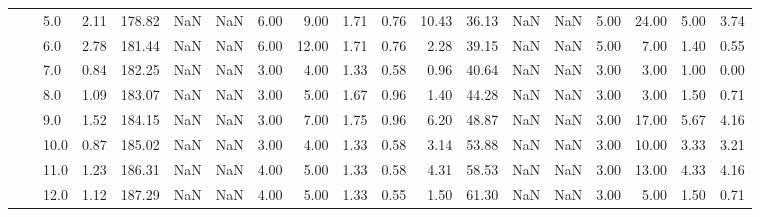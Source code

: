 \begin{tabular}{lllrrrrrrrrrrrrrrrr}
       &     & 5.0  &      2.11 &     178.82 &               NaN &                NaN &  6.00 &   9.00 &             1.71 &                         0.76 &     10.43 &      36.13 &               NaN &                NaN &  5.00 &  24.00 &             5.00 &                         3.74 \\
       &     & 6.0  &      2.78 &     181.44 &               NaN &                NaN &  6.00 &  12.00 &             1.71 &                         0.76 &      2.28 &      39.15 &               NaN &                NaN &  5.00 &   7.00 &             1.40 &                         0.55 \\
       &     & 7.0  &      0.84 &     182.25 &               NaN &                NaN &  3.00 &   4.00 &             1.33 &                         0.58 &      0.96 &      40.64 &               NaN &                NaN &  3.00 &   3.00 &             1.00 &                         0.00 \\
       &     & 8.0  &      1.09 &     183.07 &               NaN &                NaN &  3.00 &   5.00 &             1.67 &                         0.96 &      1.40 &      44.28 &               NaN &                NaN &  3.00 &   3.00 &             1.50 &                         0.71 \\
       &     & 9.0  &      1.52 &     184.15 &               NaN &                NaN &  3.00 &   7.00 &             1.75 &                         0.96 &      6.20 &      48.87 &               NaN &                NaN &  3.00 &  17.00 &             5.67 &                         4.16 \\
       &     & 10.0 &      0.87 &     185.02 &               NaN &                NaN &  3.00 &   4.00 &             1.33 &                         0.58 &      3.14 &      53.88 &               NaN &                NaN &  3.00 &  10.00 &             3.33 &                         3.21 \\
       &     & 11.0 &      1.23 &     186.31 &               NaN &                NaN &  4.00 &   5.00 &             1.33 &                         0.58 &      4.31 &      58.53 &               NaN &                NaN &  3.00 &  13.00 &             4.33 &                         4.16 \\
       &     & 12.0 &      1.12 &     187.29 &               NaN &                NaN &  4.00 &   5.00 &             1.33 &                         0.55 &      1.50 &      61.30 &               NaN &                NaN &  3.00 &   5.00 &             1.50 &                         0.71 \\

\end{tabular}
